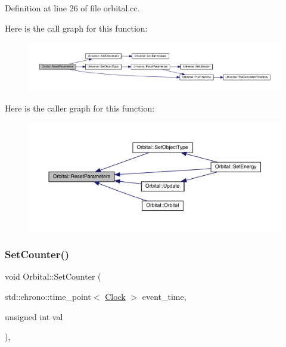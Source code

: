 Definition at line 26 of file orbital.\+cc.

Here is the call graph for this function\+:
\nopagebreak
\begin{figure}[H]
\begin{center}
\leavevmode
\includegraphics[width=350pt]{class_orbital_acc6137a5a79be91a255f685a2f065330_cgraph}
\end{center}
\end{figure}
Here is the caller graph for this function\+:
\nopagebreak
\begin{figure}[H]
\begin{center}
\leavevmode
\includegraphics[width=350pt]{class_orbital_acc6137a5a79be91a255f685a2f065330_icgraph}
\end{center}
\end{figure}
\mbox{\label{class_orbital_ae2a2fb06700d1d68501b0cbdea87cc08}} 
\subsubsection{\texorpdfstring{Set\+Counter()}{SetCounter()}}
{\footnotesize\ttfamily void Orbital\+::\+Set\+Counter (\begin{DoxyParamCaption}\item[{std\+::chrono\+::time\+\_\+point$<$ \hyperlink{universe_8h_a0ef8d951d1ca5ab3cfaf7ab4c7a6fd80}{Clock} $>$}]{event\+\_\+time,  }\item[{unsigned int}]{val }\end{DoxyParamCaption})\hspace{0.3cm}{\ttfamily [inline]}, {\ttfamily [virtual]}}




